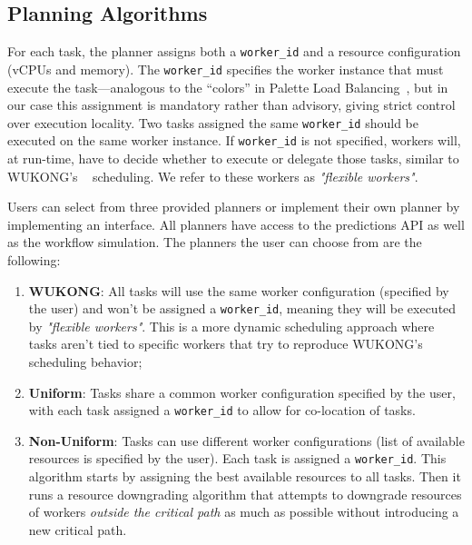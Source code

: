 \subsection{Planning Algorithms}

For each task, the planner assigns both a \texttt{worker\_id} and a resource configuration (vCPUs and memory). The \texttt{worker\_id} specifies the worker instance that must execute the task—analogous to the “colors” in Palette Load Balancing~\cite{palette_load_balancing}, but in our case this assignment is mandatory rather than advisory, giving strict control over execution locality. Two tasks assigned the same \texttt{worker\_id} should be executed on the same worker instance. If \texttt{worker\_id} is not specified, workers will, at run-time, have to decide whether to execute or delegate those tasks, similar to WUKONG's ~\cite{wukong_2} scheduling. We refer to these workers as \textit{"flexible workers"}.

Users can select from three provided planners or implement their own planner by implementing an interface. All planners have access to the predictions API as well as the workflow simulation. The planners the user can choose from are the following:

\begin{enumerate}
    \item \textbf{WUKONG}: All tasks will use the same worker configuration (specified by the user) and won't be assigned a \texttt{worker\_id}, meaning they will be executed by \textit{"flexible workers"}. This is a more dynamic scheduling approach where tasks aren't tied to specific workers that try to reproduce WUKONG's scheduling behavior;
    \item \textbf{Uniform}: Tasks share a common worker configuration specified by the user, with each task assigned a \texttt{worker\_id} to allow for co-location of tasks.
    \item \textbf{Non-Uniform}: Tasks can use different worker configurations (list of available resources is specified by the user). Each task is assigned a \texttt{worker\_id}. This algorithm starts by assigning the best available resources to all tasks. Then it runs a resource downgrading algorithm that attempts to downgrade resources of workers \textit{outside the critical path} as much as possible without introducing a new critical path.
\end{enumerate}

